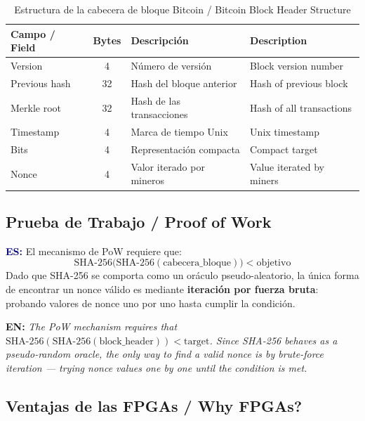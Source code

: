 \documentclass[12pt,a4paper]{article}
\newcommand{\es}[1]{\foreignlanguage{spanish}{#1}}
\newcommand{\en}[1]{\foreignlanguage{english}{#1}}
\newcommand{\bsubsection}[2]{%
    \subsection{#1 \textnormal{\small\color{accentblue}/ #2}}%
}
\newenvironment{bilingual}{%
    \par\medskip
}{%
    \par\medskip
}
\newcommand{\espara}[1]{\noindent\textcolor{darkblue}{\textbf{ES:}} #1\par\smallskip}
\newcommand{\enpara}[1]{\noindent\textcolor{accentblue}{\textbf{EN:}} \textit{#1}\par\smallskip}
\begin{document}
\begin{table}[h]
    \centering
    \caption{\es{Estructura de la cabecera de bloque Bitcoin} /
             \en{Bitcoin Block Header Structure}}
    \begin{tabular}{@{}lcll@{}}
        \toprule
        \textbf{\es{Campo} / \en{Field}} & \textbf{Bytes} &
        \textbf{\es{Descripci\'on}} & \textbf{\en{Description}} \\
        \midrule
        Version           & 4  & N\'umero de versi\'on       & Block version number \\
        Previous hash     & 32 & Hash del bloque anterior  & Hash of previous block \\
        Merkle root       & 32 & Hash de las transacciones & Hash of all transactions \\
        Timestamp         & 4  & Marca de tiempo Unix      & Unix timestamp \\
        Bits              & 4  & Representaci\'on compacta   & Compact target \\
        Nonce             & 4  & Valor iterado por mineros & Value iterated by miners \\
        \bottomrule
    \end{tabular}
\end{table}

\bsubsection{Prueba de Trabajo}{Proof of Work}

\begin{bilingual}
\espara{%
El mecanismo de PoW requiere que:
\begin{equation}
    \text{SHA-256}\bigl(\text{SHA-256}(\text{cabecera\_bloque})\bigr) < \text{objetivo}
\end{equation}
Dado que SHA-256 se comporta como un or\'aculo pseudo-aleatorio, la \'unica forma
de encontrar un nonce v\'alido es mediante \textbf{iteraci\'on por fuerza bruta}:
probando valores de nonce uno por uno hasta cumplir la condici\'on.}

\enpara{%
The PoW mechanism requires that
$\text{SHA-256}(\text{SHA-256}(\text{block\_header})) < \text{target}$.
Since SHA-256 behaves as a pseudo-random oracle, the only way to find a
valid nonce is by brute-force iteration --- trying nonce values one by one
until the condition is met.}
\end{bilingual}

\bsubsection{Ventajas de las FPGAs}{Why FPGAs?}
\end{document}
